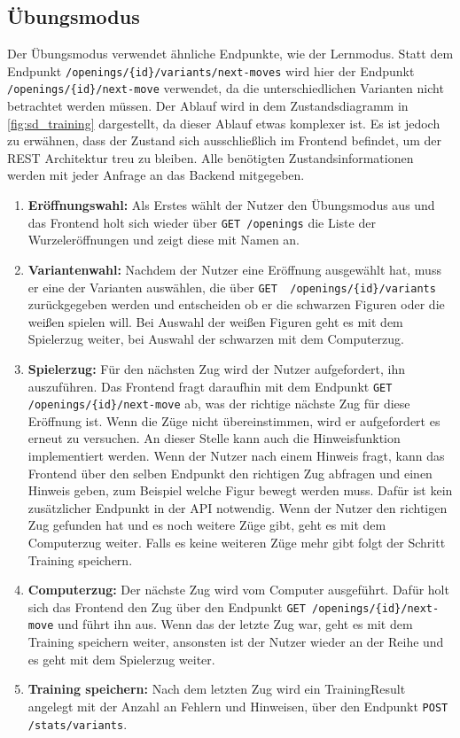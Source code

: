 \clearpage

\subsection{Übungsmodus}
Der Übungsmodus verwendet ähnliche Endpunkte, wie der Lernmodus. Statt dem Endpunkt \lstinline|/openings/{id}/variants/next-moves| wird hier der Endpunkt \lstinline|/openings/{id}/next-move| verwendet, da die unterschiedlichen Varianten nicht betrachtet werden müssen. Der Ablauf wird in dem Zustandsdiagramm in \autoref{fig:sd_training} dargestellt, da dieser Ablauf etwas komplexer ist. Es ist jedoch zu erwähnen, dass der Zustand sich ausschließlich im Frontend befindet, um der REST Architektur treu zu bleiben. Alle benötigten Zustandsinformationen werden mit jeder Anfrage an das Backend mitgegeben.

\begin{enumerate}
    \item \textbf{Eröffnungswahl:} Als Erstes wählt der Nutzer den Übungsmodus aus und das Frontend holt sich wieder über \lstinline{GET /openings} die Liste der Wurzeleröffnungen und zeigt diese mit Namen an.
    \item \textbf{Variantenwahl:} Nachdem der Nutzer eine Eröffnung ausgewählt hat, muss er eine der Varianten auswählen, die über \lstinline|GET  /openings/{id}/variants| zurückgegeben werden und entscheiden ob er die schwarzen Figuren oder die weißen spielen will. Bei Auswahl der weißen Figuren geht es mit dem Spielerzug weiter, bei Auswahl der schwarzen mit dem Computerzug.
    \item \textbf{Spielerzug:} Für den nächsten Zug wird der Nutzer aufgefordert, ihn auszuführen. Das Frontend fragt daraufhin mit dem Endpunkt \lstinline|GET /openings/{id}/next-move| ab, was der richtige nächste Zug für diese Eröffnung ist. Wenn die Züge nicht übereinstimmen, wird er aufgefordert es erneut zu versuchen. An dieser Stelle kann auch die Hinweisfunktion implementiert werden. Wenn der Nutzer nach einem Hinweis fragt, kann das Frontend über den selben Endpunkt den richtigen Zug abfragen und einen Hinweis geben, zum Beispiel welche Figur bewegt werden muss. Dafür ist kein zusätzlicher Endpunkt in der API notwendig. Wenn der Nutzer den richtigen Zug gefunden hat und es noch weitere Züge gibt, geht es mit dem Computerzug weiter. Falls es keine weiteren Züge mehr gibt folgt der Schritt Training speichern.
    \item \textbf{Computerzug:} Der nächste Zug wird vom Computer ausgeführt. Dafür holt sich das Frontend den Zug über den Endpunkt \lstinline|GET /openings/{id}/next-move| und führt ihn aus. Wenn das der letzte Zug war, geht es mit dem Training speichern weiter, ansonsten ist der Nutzer wieder an der Reihe und es geht mit dem Spielerzug weiter.
    \item \textbf{Training speichern:} Nach dem letzten Zug wird ein TrainingResult angelegt mit der Anzahl an Fehlern und Hinweisen, über den Endpunkt \lstinline|POST /stats/variants|.
\end{enumerate}

